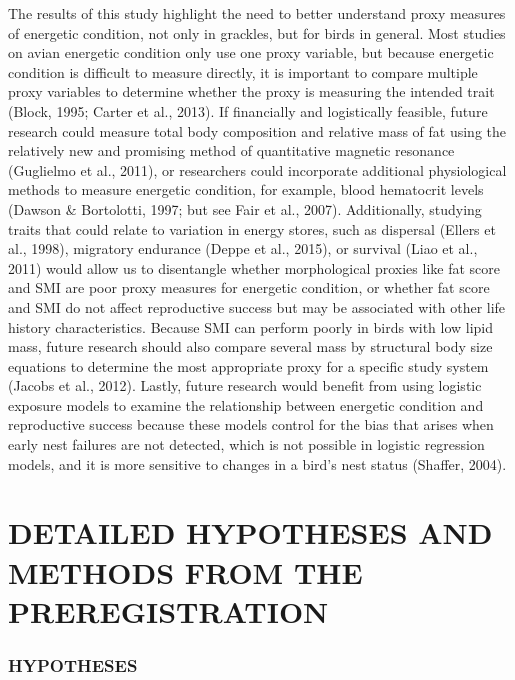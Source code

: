 \documentclass[
]{article}
\begin{document}
The results of this study highlight the need to better understand proxy
measures of energetic condition, not only in grackles, but for birds in
general. Most studies on avian energetic condition only use one proxy
variable, but because energetic condition is difficult to measure
directly, it is important to compare multiple proxy variables to
determine whether the proxy is measuring the intended trait (Block,
1995; Carter et al., 2013). If financially and logistically feasible,
future research could measure total body composition and relative mass
of fat using the relatively new and promising method of quantitative
magnetic resonance (Guglielmo et al., 2011), or researchers could
incorporate additional physiological methods to measure energetic
condition, for example, blood hematocrit levels (Dawson \& Bortolotti,
1997; but see Fair et al., 2007). Additionally, studying traits that
could relate to variation in energy stores, such as dispersal (Ellers et
al., 1998), migratory endurance (Deppe et al., 2015), or survival (Liao
et al., 2011) would allow us to disentangle whether morphological
proxies like fat score and SMI are poor proxy measures for energetic
condition, or whether fat score and SMI do not affect reproductive
success but may be associated with other life history characteristics.
Because SMI can perform poorly in birds with low lipid mass, future
research should also compare several mass by structural body size
equations to determine the most appropriate proxy for a specific study
system (Jacobs et al., 2012). Lastly, future research would benefit from
using logistic exposure models to examine the relationship between
energetic condition and reproductive success because these models
control for the bias that arises when early nest failures are not
detected, which is not possible in logistic regression models, and it is
more sensitive to changes in a bird's nest status (Shaffer, 2004).

\pagebreak

\hypertarget{detailed-hypotheses-and-methods-from-the-preregistration}{%
\section{DETAILED HYPOTHESES AND METHODS FROM THE
PREREGISTRATION}\label{detailed-hypotheses-and-methods-from-the-preregistration}}

\hypertarget{hypotheses-1}{%
\subsubsection{HYPOTHESES}\label{hypotheses-1}}
\end{document}
